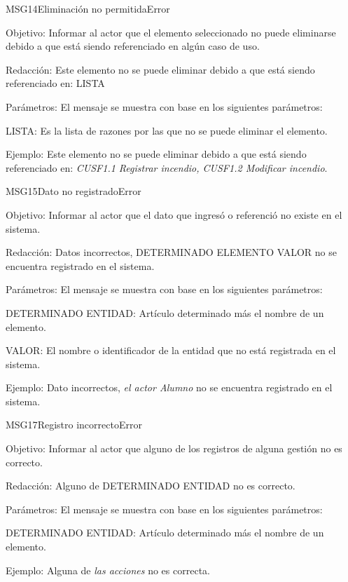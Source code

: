 \begin{mensaje}{MSG14}{Eliminación no permitida}{Error}
    \item[Objetivo:] Informar al actor que el elemento seleccionado no puede eliminarse debido a que está siendo referenciado en algún caso de uso.
    \item[Redacción:] Este elemento no se puede eliminar debido a que está siendo referenciado en: LISTA
    \item[Parámetros:] El mensaje se muestra con base en los siguientes parámetros:
    \begin{Citemize}
	\item LISTA: Es la lista de razones por las que no se puede eliminar el elemento.
    \end{Citemize}
    \item[Ejemplo:] Este elemento no se puede eliminar debido a que está siendo referenciado en: {\em CUSF1.1 Registrar incendio, CUSF1.2 Modificar incendio}.
\end{mensaje}
\begin{mensaje}{MSG15}{Dato no registrado}{Error}
    \item[Objetivo:] Informar al actor que el dato que ingresó o referenció no existe en el sistema.
    \item[Redacción:] Datos incorrectos, DETERMINADO ELEMENTO VALOR no se encuentra registrado en el sistema.
    \item[Parámetros:] El mensaje se muestra con base en los siguientes parámetros:
    \begin{Citemize}
	\item DETERMINADO ENTIDAD: Artículo determinado más el nombre de un elemento.
	\item VALOR: El nombre o identificador de la entidad que no está registrada en el sistema.
    \end{Citemize}
    \item[Ejemplo:] Dato incorrectos, { \em el actor Alumno} no se encuentra registrado en el sistema.
\end{mensaje}
\begin{mensaje}{MSG17}{Registro incorrecto}{Error}
    \item[Objetivo:] Informar al actor que alguno de los registros de alguna gestión no es correcto.
    \item[Redacción:] Alguno de DETERMINADO ENTIDAD no es correcto.
    \item[Parámetros:] El mensaje se muestra con base en los siguientes parámetros:
    \begin{Citemize}
	\item DETERMINADO ENTIDAD: Artículo determinado más el nombre de un elemento.
    \end{Citemize}
    \item[Ejemplo:] Alguna de {\em las acciones} no es correcta.
\end{mensaje}
